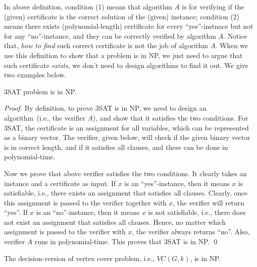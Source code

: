 In above definition, condition (1) means that algorithm $A$ is for verifying if the (given) certificate is the correct solution of the (given) instance;
condition (2) means there exists (polynomial-length) certificate
for every ``yes''-instnace but not for any ``no''-instance, and they can be correctly verified by algorithm $A$.
Notice that, \emph{how to find} such correct certificate is not the job of algorithm $A$.
When we use this definition to show that a problem is in NP, we just need to argue that
such certificate \emph{exists}, we don't need to design algorithms to find it out.
We give two examples below.

\begin{fact}
3SAT problem is in NP.
\end{fact}
\emph{Proof.} By definition, to prove 3SAT is in NP, we need to design an
algorithm~(i.e., the verifier $A$), and show that it satisfies the two
conditions. For 3SAT, the certificate is an assignment for all variables,
which can be represented as a binary vector. The verifier, given below, will check
if the given binary vector is in correct length, and if it satisfies all clauses,
and these can be done in polynomial-time.

\begin{minipage}{0.8\textwidth}
	\xxx
	\xxx
	\xxx
	\xxx
	\xxx
\end{minipage}

Now we prove that above verifier satisfies the two conditions.
It clearly takes an instance and a certificate as input.
If $x$ is an ``yes''-instance, then it means $x$ is satisfiable, i.e.,
there exists an assignment that satisfies all clauses.
Clearly, once this assignment is passed to the verifier together with $x$,
the verifier will return ``yes''.
If $x$ is an ``no''-instance, then it means $x$ is not satisfiable, i.e.,
there does not exist an assignment that satisfies all clauses.
Hence, no matter which assignment is passed to the verifier with $x$,
the verifier always returns ``no''. Also, verifier $A$ runs in polynomial-time.
This proves that 3SAT is in NP.
\qed


\begin{fact}
The decision-version of vertex cover problem, i.e., $VC(G, k)$, is in NP.
\end{fact}


